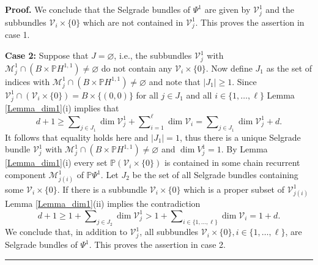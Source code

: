 \documentclass[10pt,a4paper]{amsart}
\newenvironment{proof}[1][Proof]{\noindent\textbf{#1.} }{\ \rule{0.5em}{0.5em}}
\begin{document}
\begin{proof}
		We conclude that the Selgrade bundles of $\Psi^{1}$ are given by
		$\mathcal{V}_{j}^{1}$ and the subbundles $\mathcal{V}_{i}\times\{0\}$ which
		are not contained in $\mathcal{V}_{j}^{1}$. This proves the assertion in case 1.
		
		\textbf{Case 2:} Suppose that $J=\varnothing$, i.e., the subbundles
		$\mathcal{V}_{j}^{1}$ with $\mathcal{M}_{j}^{1}\cap\left(  B\times
		\mathbb{P}H^{1,1}\right)  \not =\varnothing$ do not contain any $\mathcal{V}%
		_{i}\times\{0\}$. Now define $J_{1}$ as the set of indices with $\mathcal{M}%
		_{j}^{1}\cap\left(  B\times\mathbb{P}H^{1,1}\right)  \not =\varnothing$ and
		note that $\left\vert J_{1}\right\vert \geq1$. Since $\mathcal{V}_{j}^{1}%
		\cap\left(  \mathcal{V}_{i}\times\{0\}\right)  =B\times\{(0,0)\}$ for all
		$j\in J_{1}$ and all $i\in\{1,\ldots,\ell\}$ Lemma \ref{Lemma_dim1}(i) implies
		that
		\[
		d+1\geq\sum\nolimits_{j\in J_{1}}\dim\mathcal{V}_{j}^{1}+\sum\nolimits_{i=1}%
		^{\ell}\dim\mathcal{V}_{i}=\sum\nolimits_{j\in J_{1}}\dim\mathcal{V}_{j}%
		^{1}+d.
		\]
		It follows that equality holds here and $\left\vert J_{1}\right\vert =1$, thus
		there is a unique Selgrade bundle $\mathcal{V}_{j}^{1}$ with $\mathcal{M}%
		_{j}^{1}\cap\left(  B\times\mathbb{P}H^{1,1}\right)  \not =\varnothing$ and
		$\dim V_{j}^{1}=1$. By Lemma \ref{Lemma_dim1}(i) every set $\mathbb{P}\left(
		\mathcal{V}_{i}\times\{0\}\right)  $ is contained in some chain recurrent
		component $\mathcal{M}_{j(i)}^{1}$ of $\mathbb{P}\Psi^{1}$. Let $J_{2}$ be the
		set of all Selgrade bundles containing some $\mathcal{V}_{i}\times\{0\}$. If
		there is a subbundle $\mathcal{V}_{i}\times\{0\}$ which is a proper subset of
		$\mathcal{V}_{j(i)}^{1}$ Lemma \ref{Lemma_dim1}(ii) implies the contradiction%
		\[
		d+1\geq1+\sum\nolimits_{j\in J_{2}}\dim\mathcal{V}_{j}^{1}>1+\sum
		\nolimits_{i\in\{1,\ldots,\ell\}}\dim\mathcal{V}_{i}=1+d.
		\]
		We conclude that, in addition to $\mathcal{V}_{j}^{1}$, all subbundles
		$\mathcal{V}_{i}\times\{0\},i\in\{1,\ldots,\ell\}$, are Selgrade bundles of
		$\Psi^{1}$. This proves the assertion in case 2.
	\end{proof}
\end{document}
